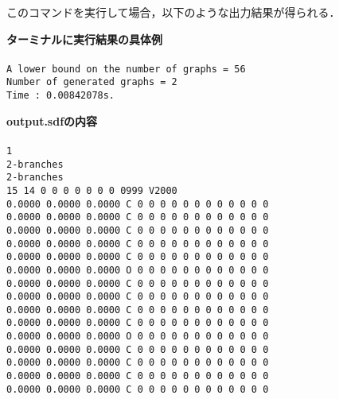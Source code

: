 \documentclass[11pt,titlepage,dvipdfmx,twoside]{jarticle}
\begin{document}
このコマンドを実行して場合，以下のような出力結果が得られる．

\begin{oframed}
{\bf ターミナルに実行結果の具体例}\\\\
{\tt A lower bound on the number of graphs = 56\\
Number of generated graphs = 2\\
Time : 0.00842078s.}
\end{oframed}

\begin{oframed}
{\bf output.sdfの内容}\\\\
{\tt 1\\
2-branches\\
2-branches\\
 15 14  0  0  0  0  0  0  0  0999 V2000 \\
    0.0000    0.0000    0.0000  C  0  0  0  0  0  0  0  0  0  0  0  0\\
    0.0000    0.0000    0.0000  C  0  0  0  0  0  0  0  0  0  0  0  0\\
    0.0000    0.0000    0.0000  C  0  0  0  0  0  0  0  0  0  0  0  0\\
    0.0000    0.0000    0.0000  C  0  0  0  0  0  0  0  0  0  0  0  0\\
    0.0000    0.0000    0.0000  C  0  0  0  0  0  0  0  0  0  0  0  0\\
    0.0000    0.0000    0.0000  O  0  0  0  0  0  0  0  0  0  0  0  0\\
    0.0000    0.0000    0.0000  C  0  0  0  0  0  0  0  0  0  0  0  0\\
    0.0000    0.0000    0.0000  C  0  0  0  0  0  0  0  0  0  0  0  0\\
    0.0000    0.0000    0.0000  C  0  0  0  0  0  0  0  0  0  0  0  0\\
    0.0000    0.0000    0.0000  C  0  0  0  0  0  0  0  0  0  0  0  0\\
    0.0000    0.0000    0.0000  O  0  0  0  0  0  0  0  0  0  0  0  0\\
    0.0000    0.0000    0.0000  C  0  0  0  0  0  0  0  0  0  0  0  0\\
    0.0000    0.0000    0.0000  C  0  0  0  0  0  0  0  0  0  0  0  0\\
    0.0000    0.0000    0.0000  C  0  0  0  0  0  0  0  0  0  0  0  0\\
    0.0000    0.0000    0.0000  C  0  0  0  0  0  0  0  0  0  0  0  0\\
}
\end{oframed}
\end{document}
